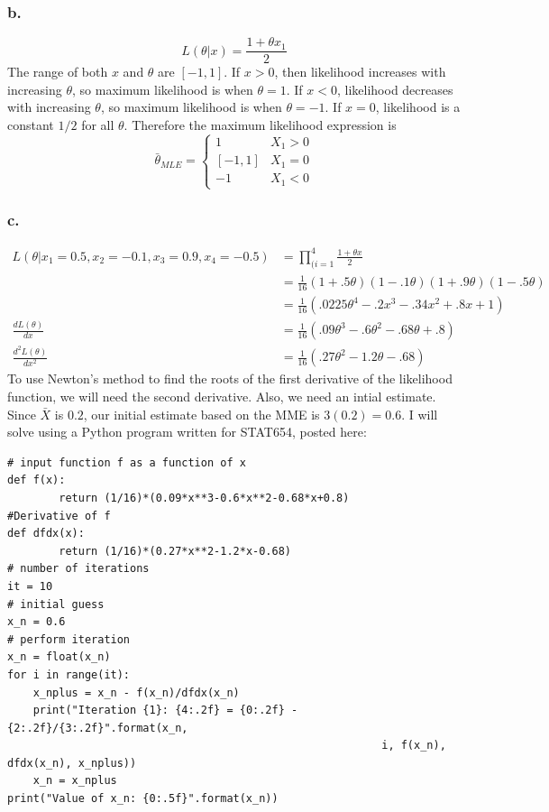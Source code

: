 \documentclass{article}
\begin{document}
\subsubsection*{b.}
\[L(\theta|x) = \frac{1+\theta x_1}{2}\]
The range of both $x$ and $\theta$ are $[-1,1]$. If $x>0$, then likelihood increases with increasing $\theta$, so maximum likelihood is when $\theta =1$. If $x<0$, likelihood decreases with increasing $\theta$, so maximum likelihood is when $\theta = -1$. If $x=0$, likelihood is a constant $1/2$ for all $\theta$. Therefore the maximum likelihood expression is 
\[\bar{\theta}_{MLE} = \begin{cases}1 & X_1 > 0 \\ [-1,1] & X_1 = 0 \\-1 & X_1 < 0\end{cases}\]
\subsubsection*{c.}
\begin{align*}
L(\theta|x_1=0.5,x_2=-0.1,x_3=0.9,x_4=-0.5) &= \prod_{(i=1}^4 \frac{1+\theta x}{2} \\
&=\frac{1}{16}(1+.5\theta)(1-.1\theta)(1+.9\theta)(1-.5\theta) \\
&=\frac{1}{16}(.0225\theta^4-.2x^3-.34x^2+.8x+1) \\
\frac{dL(\theta)}{dx} &= \frac{1}{16}(.09\theta^3-.6\theta^2-.68\theta+.8) \\
\frac{d^2L(\theta)}{dx^2} &= \frac{1}{16}(.27\theta^2-1.2\theta-.68)
\end{align*}
To use Newton's method to find the roots of the first derivative of the likelihood function, we will need the second derivative. Also, we need an intial estimate. Since $\bar{X}$ is $0.2$, our initial estimate based on the MME is $3(0.2) = 0.6$. I will solve using a Python program written for STAT654, posted here:
\pagebreak
\begin{verbatim}
# input function f as a function of x
def f(x):
        return (1/16)*(0.09*x**3-0.6*x**2-0.68*x+0.8)       
#Derivative of f
def dfdx(x):
        return (1/16)*(0.27*x**2-1.2*x-0.68)       
# number of iterations
it = 10
# initial guess
x_n = 0.6
# perform iteration
x_n = float(x_n)
for i in range(it):
    x_nplus = x_n - f(x_n)/dfdx(x_n)
    print("Iteration {1}: {4:.2f} = {0:.2f} - {2:.2f}/{3:.2f}".format(x_n,
                                                          i, f(x_n), dfdx(x_n), x_nplus))
    x_n = x_nplus
print("Value of x_n: {0:.5f}".format(x_n))
\end{verbatim}
\end{document}
